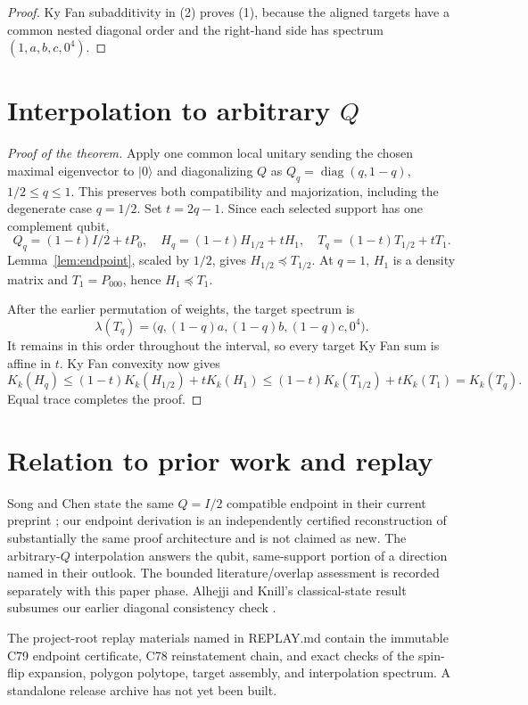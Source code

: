 \documentclass[11pt]{article}
\newcommand{\KF}{K}
\begin{document}
\begin{proof}
Ky Fan subadditivity in (2) proves (1), because the aligned targets have a
common nested diagonal order and the right-hand side has spectrum
\((1,a,b,c,0^4)\).
\end{proof}

\section{Interpolation to arbitrary \(Q\)}

\begin{proof}[Proof of the theorem]
Apply one common local unitary sending the chosen maximal eigenvector to
\(|0\rangle\) and diagonalizing \(Q\) as
\(Q_q=\operatorname{diag}(q,1-q)\), \(1/2\le q\le1\).  This preserves both
compatibility and majorization, including the degenerate case \(q=1/2\).
Set \(t=2q-1\).  Since each selected support has one complement qubit,
\[
Q_q=(1-t)I/2+tP_0,\quad
H_q=(1-t)H_{1/2}+tH_1,\quad
T_q=(1-t)T_{1/2}+tT_1. \tag{9}
\]
Lemma~\ref{lem:endpoint}, scaled by \(1/2\), gives
\(H_{1/2}\preceq T_{1/2}\). At \(q=1\),
\(H_1\) is a density matrix and \(T_1=P_{000}\), hence
\(H_1\preceq T_1\).

After the earlier permutation of weights, the target spectrum is
\[
\lambda(T_q)=\bigl(q,(1-q)a,(1-q)b,(1-q)c,0^4\bigr). \tag{10}
\]
It remains in this order throughout the interval, so every target Ky Fan sum
is affine in \(t\).  Ky Fan convexity now gives
\[
\KF_k(H_q)\le(1-t)\KF_k(H_{1/2})+t\KF_k(H_1)
\le(1-t)\KF_k(T_{1/2})+t\KF_k(T_1)=\KF_k(T_q).
\]
Equal trace completes the proof.
\end{proof}

\section{Relation to prior work and replay}

Song and Chen state the same \(Q=I/2\) compatible endpoint in their current
preprint \cite[Proposition 3]{SongChen}; our endpoint derivation is an
independently certified reconstruction of substantially the same proof
architecture and is not claimed as new. The arbitrary-\(Q\) interpolation
answers the qubit, same-support portion of a direction named in their
outlook. The bounded literature/overlap assessment is recorded separately
with this paper phase.
Alhejji and Knill's classical-state result subsumes our earlier diagonal
consistency check \cite[Proposition IV.5]{AlhejjiKnill}.

The project-root replay materials named in REPLAY.md contain the immutable
C79 endpoint certificate, C78 reinstatement chain, and exact checks of the
spin-flip expansion, polygon polytope, target assembly, and interpolation
spectrum. A standalone release archive has not yet been built.
\end{document}
